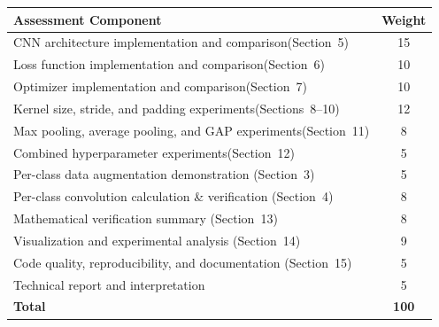 \documentclass[12pt,a4paper]{article}
\begin{document}
\begin{center}
\renewcommand{\arraystretch}{1.4}
\begin{tabular}{|p{10cm}|c|}
\hline
\textbf{Assessment Component} & \textbf{Weight} \\
\hline
CNN architecture implementation and comparison\newline (Section~5) & 15 \\
\hline
Loss function implementation and comparison\newline  (Section~6) & 10 \\
\hline
Optimizer implementation and comparison\newline  (Section~7) & 10 \\
\hline
Kernel size, stride, and padding experiments\newline  (Sections~8--10) & 12 \\
\hline
Max pooling, average pooling, and GAP experiments\newline  (Section~11) & 8 \\
\hline
Combined hyperparameter experiments\newline  (Section~12) & 5 \\
\hline
Per-class data augmentation demonstration \newline (Section~3) & 5 \\
\hline
Per-class convolution calculation \& verification \newline (Section~4) & 8 \\
\hline
Mathematical verification summary \newline (Section~13) & 8 \\
\hline
Visualization and experimental analysis \newline (Section~14) & 9 \\
\hline
Code quality, reproducibility, and documentation \newline (Section~15) & 5 \\
\hline
Technical report and interpretation & 5 \\
\hline
\textbf{Total} & \textbf{100} \\
\hline
\end{tabular}
\end{center}
\end{document}
